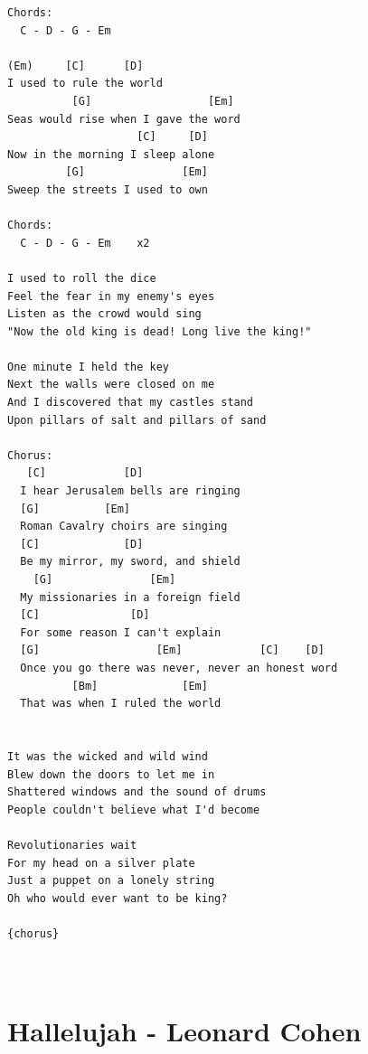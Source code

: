 \documentclass[
]{book}
\let\stdsection\section
\renewcommand\section{\clearpage\stdsection}
\begin{document}
\begin{verbatim}
Chords:
  C - D - G - Em 

(Em)     [C]      [D]
I used to rule the world
          [G]                  [Em]
Seas would rise when I gave the word
                    [C]     [D]
Now in the morning I sleep alone    
         [G]               [Em]
Sweep the streets I used to own

Chords:
  C - D - G - Em    x2

I used to roll the dice 
Feel the fear in my enemy's eyes 
Listen as the crowd would sing 
"Now the old king is dead! Long live the king!" 

One minute I held the key 
Next the walls were closed on me 
And I discovered that my castles stand 
Upon pillars of salt and pillars of sand 

Chorus:
   [C]            [D]
  I hear Jerusalem bells are ringing
  [G]          [Em]
  Roman Cavalry choirs are singing
  [C]             [D]
  Be my mirror, my sword, and shield
    [G]               [Em]
  My missionaries in a foreign field
  [C]              [D]
  For some reason I can't explain
  [G]                  [Em]            [C]    [D]
  Once you go there was never, never an honest word
          [Bm]             [Em]
  That was when I ruled the world
  

It was the wicked and wild wind 
Blew down the doors to let me in 
Shattered windows and the sound of drums 
People couldn't believe what I'd become 

Revolutionaries wait 
For my head on a silver plate 
Just a puppet on a lonely string 
Oh who would ever want to be king? 

{chorus}



\end{verbatim}

\hypertarget{selected-songs-hallelujah}{%
\section{Hallelujah - Leonard Cohen}\label{selected-songs-hallelujah}}
\end{document}
